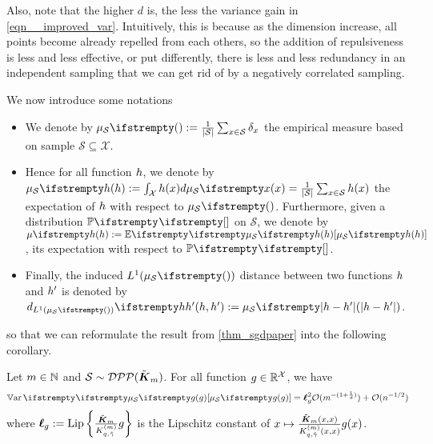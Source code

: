 Also, note that the higher $d$ is, the less the variance gain in \cref{eqn__improved_var}. Intuitively, this is because as the dimension increase, all points become already repelled from each others, so the addition of repulsiveness is less and less effective, or put differently, there is less and less redundancy in an independent sampling that we can get rid of by a negatively correlated sampling.


We now introduce some notations
\begin{itemize}
	\item We denote by $\empdistr{\mathcal{S}}{}:=\frac{1}{|\mathcal{S}|} \sum_{x \in \mathcal{S}} \delta_x$ the empirical measure based on sample $\mathcal{S}  \subseteq \mathcal{X}$. 
	\item Hence for all function $h$, we denote by $\empdistr{\mathcal{S}}{\threequery}:=\int_{\mathcal{X}} \threequery(x) d\empdistr{\mathcal{S}}{x} = \frac{1}{|\mathcal{S}|} \sum_{x \in \mathcal{S}} \threequery(x)$ the expectation of $h$ with respect to $\empdistr{\mathcal{S}}{}$. Furthermore, given a distribution $\PP{}{}$ on $\mathcal{S}$, we denote by $\meanempdistr{\threequery}:=\EE{}{\empdistr{\mathcal{S}}{\threequery}}$, its expectation with respect to $\PP{}{}$. 
	\item Finally, the induced $L^1(\empdistr{\mathcal{S}}{})$ distance between two functions $h$ and $h'$ is denoted by $\dlone{\empdistr{\mathcal{S}}{}}{\threequery}{\threequery'}:=\empdistr{\mathcal{S}}{|\threequery - \threequery'|}$.
\end{itemize}  


so that we can reformulate the result from \cref{thm_sgdpaper} into the following corollary.
\begin{tcolorbox}
	\begin{corollary}
		\label{cor_sgdpaper}
		Let $m\in \mathbb{N}$ and $\mathcal{S} \sim  \mathcal{DPP}(\tilde{\boldsymbol K}_{m})$.
		For all function $g \in \mathbb{R}^{\mathcal{X}}$, we have
		\begin{equation*}
			\Var{}{\empdistr{\mathcal{S}}{\twoquery}} = \lipschitz^2_\twoquery \OO( m ^{-(1+\frac 1 d)}) +\OO( n^{-1/2})
		\end{equation*}
		where $\boldsymbol\ell_g := \operatorname{Lip}\left\{\frac{\tilde{\boldsymbol K}_{m}}{K^{(m)}_{q, \tilde \gamma}} g \right\}$ is the Lipschitz constant of $x \mapsto\frac{\tilde{\boldsymbol K}_{m}(x,x)}{K^{(m)}_{q, \tilde \gamma}(x,x)} g(x) $.
	\end{corollary}
\end{tcolorbox}

